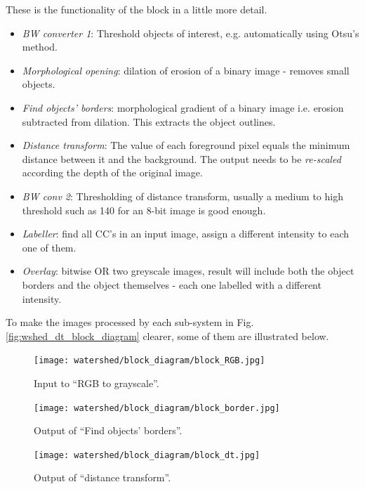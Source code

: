 \documentclass[a4paper]{article}
\begin{document}
These is the functionality of the block in a little more detail.
\begin{itemize}
    \item \textit{BW converter 1}: Threshold objects of interest, e.g. automatically using Otsu's method.
    \item \textit{Morphological opening}: dilation of erosion of a binary image - removes small objects.
    \item \textit{Find objects' borders}: morphological gradient of a binary image i.e. erosion subtracted from dilation. This extracts the object outlines.
    \item \textit{Distance transform}: The value of each foreground pixel equals the minimum distance between it and the background. The output needs to be \textit{re-scaled} according the depth of the original image.
    \item \textit{BW conv 2}: Thresholding of distance transform, usually a medium to high threshold such as 140 for an 8-bit image is good enough.
    \item \textit{Labeller}: find all CC's in an input image, assign a different intensity to each one of them.
    \item \textit{Overlay}: bitwise OR two greyscale images, result will include both the object borders and the object themselves - each one labelled with a different intensity.
\end{itemize}
To make the images processed by each sub-system in Fig. \ref{fig:wshed_dt_block_diagram} clearer, some of them are illustrated below.
\begin{multicols}{3}
\begin{figure}[H]
	\centering 
	    \captionsetup{width=0.25\textwidth}
    	\texttt{[image: watershed/block\_diagram/block\_RGB.jpg]}
    \caption{Input to ``RGB to grayscale''.} 
\end{figure}
\columnbreak
\begin{figure}[H]
	\centering %
	    \captionsetup{width=0.25\textwidth}
    	\texttt{[image: watershed/block\_diagram/block\_border.jpg]}
    \caption{Output of ``Find objects' borders''.} 
\end{figure}
\columnbreak
\begin{figure}[H]
	\centering %
	    \captionsetup{width=0.25\textwidth}
    	\texttt{[image: watershed/block\_diagram/block\_dt.jpg]}
    \caption{Output of ``distance transform''.} 
\end{figure}
\end{multicols}
\end{document}

